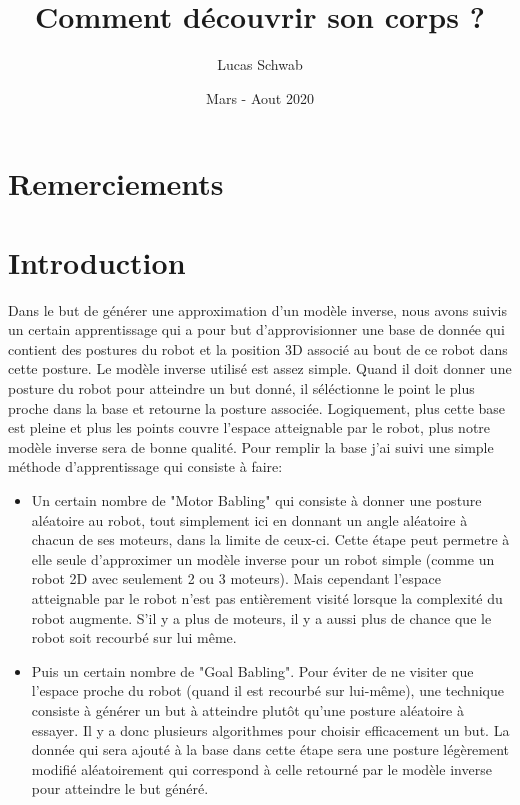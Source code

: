 \documentclass[11pt,french]{article}
\title{Comment découvrir son corps ?}
\author{Lucas Schwab}
\date{Mars - Aout 2020}
\begin{document}
\maketitle

\tableofcontents

\section{Remerciements}

\section{Introduction}

Dans le but de générer une approximation d'un modèle inverse, nous avons suivis un certain apprentissage qui a pour but d'approvisionner une base de donnée qui contient des postures du robot et la position 3D associé au bout de ce robot dans cette posture. Le modèle inverse utilisé est assez simple. Quand il doit donner une posture du robot pour atteindre un but donné, il séléctionne le point le plus proche dans la base et retourne la posture associée. Logiquement, plus cette base est pleine et plus les points couvre l'espace atteignable par le robot, plus notre modèle inverse sera de bonne qualité. Pour remplir la base j'ai suivi une simple méthode d'apprentissage qui consiste à faire:
\begin{itemize}
    \item Un certain nombre de "Motor Babling" qui consiste à donner une posture aléatoire au robot, tout simplement ici en donnant un angle aléatoire à chacun de ses moteurs, dans la limite de ceux-ci. Cette étape peut permetre à elle seule d'approximer un modèle inverse pour un robot simple (comme un robot 2D avec seulement 2 ou 3 moteurs). Mais cependant l'espace atteignable par le robot n'est pas entièrement visité lorsque la complexité du robot augmente. S'il y a plus de moteurs, il y a aussi plus de chance que le robot soit recourbé sur lui même.
    \item Puis un certain nombre de "Goal Babling". Pour éviter de ne visiter que l'espace proche du robot (quand il est recourbé sur lui-même), une technique consiste à générer un but à atteindre plutôt qu'une posture aléatoire à essayer. Il y a donc plusieurs algorithmes pour choisir efficacement un but. La donnée qui sera ajouté à la base dans cette étape sera une posture légèrement modifié aléatoirement qui correspond à celle retourné par le modèle inverse pour atteindre le but généré.
\end{itemize}
\end{document}
